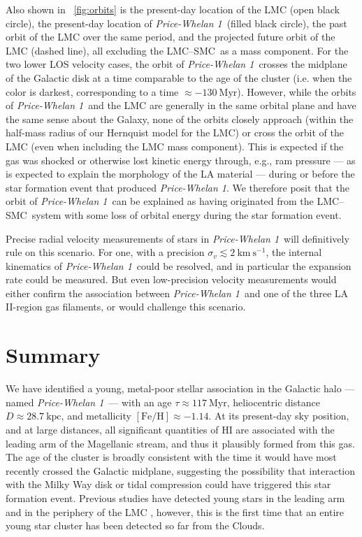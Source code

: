 \documentclass[twocolumn]{aastex62}
\newcommand{\kms}{\ensuremath{\textrm{km}~\textrm{s}^{-1}}}
\newcommand{\feh}{\ensuremath{[\textrm{Fe} / \textrm{H}]}}
\newcommand{\hi}{H{\footnotesize I} }
\newcommand{\clustername}{\textsl{Price-Whelan 1}}
\newcommand{\lmcsmc}{LMC--SMC}
\newcommand{\clage}{\ensuremath{117~\textrm{Myr}}}
\newcommand{\clfeh}{\ensuremath{-1.14}}
\newcommand{\cldist}{\ensuremath{28.7~\textrm{kpc}}}
\begin{document}
Also shown in \figurename~\ref{fig:orbits} is the present-day location of the LMC (open black circle), the present-day location of \clustername\ (filled black circle), the past orbit of the LMC over the same period, and the projected future orbit of the LMC (dashed line), all excluding the \lmcsmc\ as a mass component.
For the two lower LOS velocity cases, the orbit of \clustername\ crosses the midplane of the Galactic disk at a time comparable to the age of the cluster (i.e. when the color is darkest, corresponding to a time $\approx -130~\textrm{Myr}$).
However, while the orbits of \clustername\ and the LMC are generally in the same orbital plane and have the same sense about the Galaxy, none of the orbits closely approach (within the half-mass radius of our Hernquist model for the LMC) or cross the orbit of the LMC (even when including the LMC mass component).
This is expected if the gas was shocked or otherwise lost kinetic energy through, e.g., ram pressure --- as is expected to explain the morphology of the LA material \citep[e.g.,][]{Hammer:2015} --- during or before the star formation event that produced \clustername.
We therefore posit that the orbit of \clustername\ can be explained as having originated from the \lmcsmc\ system with some loss of orbital energy during the star formation event.

Precise radial velocity measurements of stars in \clustername\ will definitively rule on this scenario.
For one, with a precision $\sigma_v \lesssim 2~\kms$, the internal kinematics of \clustername\ could be resolved, and in particular the expansion rate could be measured.
But even low-precision velocity measurements would either confirm the association between \clustername\ and one of the three LA II-region gas filaments, or would challenge this scenario.


\section{Summary} \label{sec:conclusion}

We have identified a young, metal-poor stellar association in the Galactic halo --- named \clustername\ --- with an age $\tau \approx \clage$, heliocentric distance $D \approx \cldist$, and metallicity $\feh \approx \clfeh$.
At its present-day sky position, and at large distances, all significant quantities of \hi are associated with the leading arm of the Magellanic stream, and thus it plausibly formed from this gas.
The age of the cluster is broadly consistent with the time it would have most recently crossed the Galactic midplane, suggesting the possibility that interaction with the Milky Way disk or tidal compression could have triggered this star formation event.
Previous studies have detected young stars in the leading arm and in the periphery of the LMC \citep{Casetti-Dinescu:2014, Moni-Bidin:2017}, however, this is the first time that an entire young star cluster has been detected so far from the Clouds.
\end{document}
